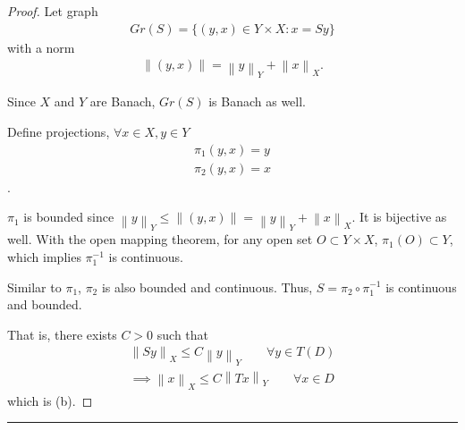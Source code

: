 \documentclass{article}
\newcommand{\norm}[1]{\left\|#1\right\|}
\begin{document}
\begin{proof}
    Let graph 
    \begin{align}
        Gr(S) = \{(y, x) \in Y \times X: x = Sy \}
    \end{align}
    with a norm 
    \begin{align}
        \norm{(y, x)} = \norm{y}_Y + \norm{x}_X. 
    \end{align}

    Since $X$ and $Y$ are Banach, $Gr(S)$ is Banach as well.

    Define projections, $\forall x \in X, y \in Y$
    \begin{align}
        \pi_1(y, x) = y
        \\
        \pi_2(y, x) = x
    \end{align}.

    $\pi_1$ is bounded since $\norm{y}_Y \le \norm{(y, x)} = \norm{y}_Y + \norm{x}_X$. It is bijective as well. With the open mapping theorem, for any open set $O \subset Y \times X$, $\pi_1(O) \subset Y $, which implies $\pi_1^{-1}$ is continuous.

    Similar to $\pi_1$, $\pi_2$ is also bounded and continuous.
    Thus, $ S = \pi_2 \circ \pi_1^{-1} $ is continuous and bounded. 

    That is, there exists $ C > 0 $ such that
    \begin{align}
    \norm{S y}_X \le C \norm{y}_Y \qquad \forall y \in T(D)
    \\
    \implies
    \norm{x}_X \le C \norm{Tx}_Y \qquad \forall x \in D
    \end{align}
    which is (b).

\end{proof}

\hrule
\vspace{0.5em}

\end{document}

